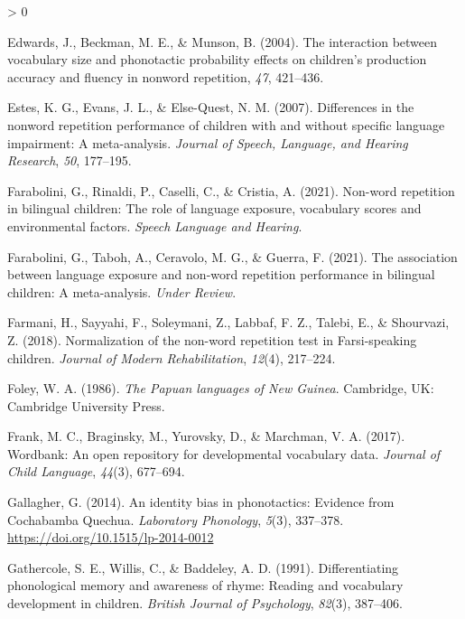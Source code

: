 \documentclass[
  english,
  ,man,floatsintext]{apa6}
\newlength{\cslhangindent}
\newenvironment{CSLReferences}[2] %
 {%
  \setlength{\parindent}{0pt}
  \ifodd #1 \everypar{\setlength{\hangindent}{\cslhangindent}}\ignorespaces\fi
  \ifnum #2 > 0
  \setlength{\parskip}{#2\baselineskip}
  \fi
 }%
 {}
\begin{document}
\begin{CSLReferences}{1}{0}
\leavevmode\hypertarget{ref-edwards2004interaction}{}%
Edwards, J., Beckman, M. E., \& Munson, B. (2004). The interaction between vocabulary size and phonotactic probability effects on children's production accuracy and fluency in nonword repetition, \emph{47}, 421--436.

\leavevmode\hypertarget{ref-estes2007differences}{}%
Estes, K. G., Evans, J. L., \& Else-Quest, N. M. (2007). Differences in the nonword repetition performance of children with and without specific language impairment: A meta-analysis. \emph{Journal of Speech, Language, and Hearing Research}, \emph{50}, 177--195.

\leavevmode\hypertarget{ref-farabolini2021nonword}{}%
Farabolini, G., Rinaldi, P., Caselli, C., \& Cristia, A. (2021). Non-word repetition in bilingual children: The role of language exposure, vocabulary scores and environmental factors. \emph{Speech Language and Hearing}.

\leavevmode\hypertarget{ref-farabolini2021association}{}%
Farabolini, G., Taboh, A., Ceravolo, M. G., \& Guerra, F. (2021). The association between language exposure and non-word repetition performance in bilingual children: A meta-analysis. \emph{Under Review}.

\leavevmode\hypertarget{ref-farmani2018normalization}{}%
Farmani, H., Sayyahi, F., Soleymani, Z., Labbaf, F. Z., Talebi, E., \& Shourvazi, Z. (2018). Normalization of the non-word repetition test in {F}arsi-speaking children. \emph{Journal of Modern Rehabilitation}, \emph{12}(4), 217--224.

\leavevmode\hypertarget{ref-foley1986papuan}{}%
Foley, W. A. (1986). \emph{{The Papuan languages of New Guinea}}. Cambridge, UK: Cambridge University Press.

\leavevmode\hypertarget{ref-frank2017wordbank}{}%
Frank, M. C., Braginsky, M., Yurovsky, D., \& Marchman, V. A. (2017). Wordbank: An open repository for developmental vocabulary data. \emph{Journal of Child Language}, \emph{44}(3), 677--694.

\leavevmode\hypertarget{ref-gallagher2014identity}{}%
Gallagher, G. (2014). {An identity bias in phonotactics: Evidence from Cochabamba Quechua}. \emph{Laboratory Phonology}, \emph{5}(3), 337--378. \url{https://doi.org/10.1515/lp-2014-0012}

\leavevmode\hypertarget{ref-gathercole1991differentiating}{}%
Gathercole, S. E., Willis, C., \& Baddeley, A. D. (1991). Differentiating phonological memory and awareness of rhyme: Reading and vocabulary development in children. \emph{British Journal of Psychology}, \emph{82}(3), 387--406.


\end{CSLReferences}
\end{document}
